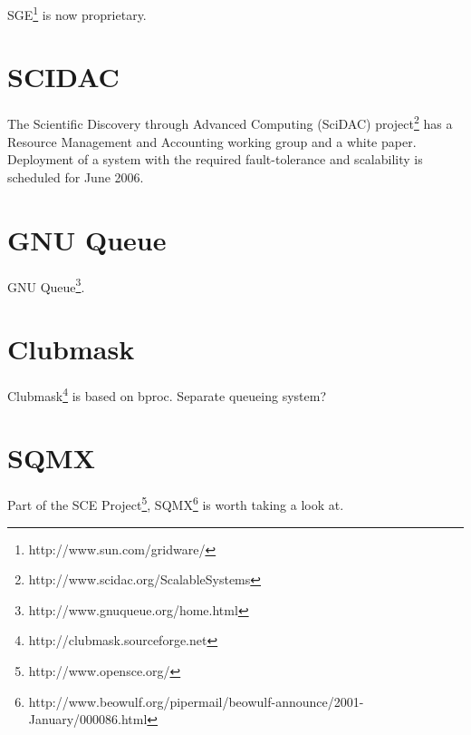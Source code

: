 \documentclass{article}
\begin{document}
SGE\footnote{http://www.sun.com/gridware/} is now proprietary.


\section{SCIDAC}

The Scientific Discovery through Advanced Computing (SciDAC)
project\footnote{http://www.scidac.org/ScalableSystems}
has a Resource Management and Accounting working group
and a white paper\cite{Res2000}. Deployment of a system with
the required fault-tolerance and scalability is scheduled
for June 2006.

\section{GNU Queue}

GNU Queue\footnote{http://www.gnuqueue.org/home.html}.

\section{Clubmask}
Clubmask\footnote{http://clubmask.sourceforge.net} is based on bproc.
Separate queueing system?

\section{SQMX}
Part of the SCE Project\footnote{http://www.opensce.org/},
SQMX\footnote{http://www.beowulf.org/pipermail/beowulf-announce/2001-January/000086.html} is worth taking a look at.

\newpage


\end{document}

